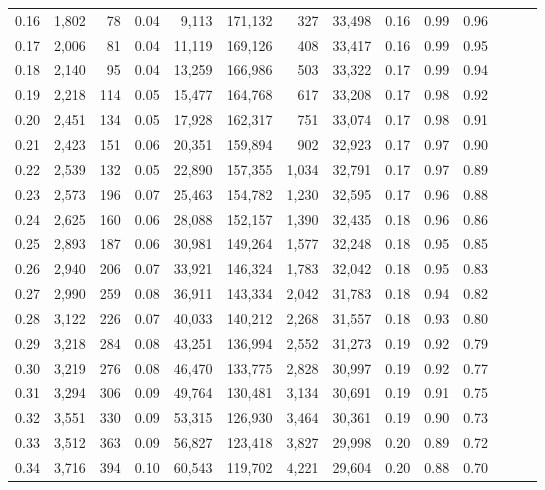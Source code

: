 \begin{tabular}{rrrrrrrrrrrrrr}
0.16 &  1,802 &   78 &  0.04 &    9,113 &  171,132 &     327 &  33,498 &  0.16 &  0.99 &      0.96 \\
0.17 &  2,006 &   81 &  0.04 &   11,119 &  169,126 &     408 &  33,417 &  0.16 &  0.99 &      0.95 \\
0.18 &  2,140 &   95 &  0.04 &   13,259 &  166,986 &     503 &  33,322 &  0.17 &  0.99 &      0.94 \\
0.19 &  2,218 &  114 &  0.05 &   15,477 &  164,768 &     617 &  33,208 &  0.17 &  0.98 &      0.92 \\
0.20 &  2,451 &  134 &  0.05 &   17,928 &  162,317 &     751 &  33,074 &  0.17 &  0.98 &      0.91 \\
0.21 &  2,423 &  151 &  0.06 &   20,351 &  159,894 &     902 &  32,923 &  0.17 &  0.97 &      0.90 \\
0.22 &  2,539 &  132 &  0.05 &   22,890 &  157,355 &   1,034 &  32,791 &  0.17 &  0.97 &      0.89 \\
0.23 &  2,573 &  196 &  0.07 &   25,463 &  154,782 &   1,230 &  32,595 &  0.17 &  0.96 &      0.88 \\
0.24 &  2,625 &  160 &  0.06 &   28,088 &  152,157 &   1,390 &  32,435 &  0.18 &  0.96 &      0.86 \\
0.25 &  2,893 &  187 &  0.06 &   30,981 &  149,264 &   1,577 &  32,248 &  0.18 &  0.95 &      0.85 \\
0.26 &  2,940 &  206 &  0.07 &   33,921 &  146,324 &   1,783 &  32,042 &  0.18 &  0.95 &      0.83 \\
0.27 &  2,990 &  259 &  0.08 &   36,911 &  143,334 &   2,042 &  31,783 &  0.18 &  0.94 &      0.82 \\
0.28 &  3,122 &  226 &  0.07 &   40,033 &  140,212 &   2,268 &  31,557 &  0.18 &  0.93 &      0.80 \\
0.29 &  3,218 &  284 &  0.08 &   43,251 &  136,994 &   2,552 &  31,273 &  0.19 &  0.92 &      0.79 \\
0.30 &  3,219 &  276 &  0.08 &   46,470 &  133,775 &   2,828 &  30,997 &  0.19 &  0.92 &      0.77 \\
0.31 &  3,294 &  306 &  0.09 &   49,764 &  130,481 &   3,134 &  30,691 &  0.19 &  0.91 &      0.75 \\
0.32 &  3,551 &  330 &  0.09 &   53,315 &  126,930 &   3,464 &  30,361 &  0.19 &  0.90 &      0.73 \\
0.33 &  3,512 &  363 &  0.09 &   56,827 &  123,418 &   3,827 &  29,998 &  0.20 &  0.89 &      0.72 \\
0.34 &  3,716 &  394 &  0.10 &   60,543 &  119,702 &   4,221 &  29,604 &  0.20 &  0.88 &      0.70 \\

\end{tabular}
